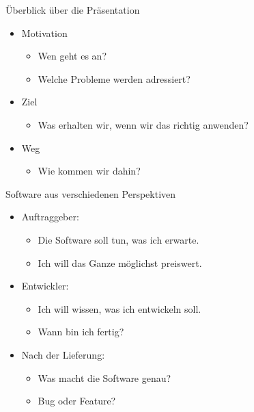 \begin{frame}{Überblick über die Präsentation}

\begin{itemize}

	\item Motivation
	\begin{itemize}
		\item Wen geht es an?
		\item Welche Probleme werden adressiert?
	\end{itemize}


	\item Ziel
	\begin{itemize}
		\item Was erhalten wir, wenn wir das richtig anwenden?
	\end{itemize}


	\item Weg
	\begin{itemize}
		\item Wie kommen wir dahin?
	\end{itemize}
\end{itemize}

\end{frame}


\begin{frame}{Software aus verschiedenen Perspektiven}

\begin{itemize}

	
	\item Auftraggeber:

	\begin{itemize}
		\item \glqq Die Software soll tun, was ich erwarte.\grqq
		\item \glqq Ich will das Ganze möglichst preiswert.\grqq
	\end{itemize}
	
	
	\item Entwickler:
	
	\begin{itemize}
		\item \glqq Ich will wissen, was ich entwickeln soll.\grqq
		\item \glqq Wann bin ich fertig?\grqq
	\end{itemize}
	
	
	\item Nach der Lieferung:
	
	\begin{itemize}
		\item \glqq Was macht die Software genau?\grqq
		\item \glqq Bug oder Feature?\grqq
	\end{itemize}
\end{itemize}

\end{frame}


